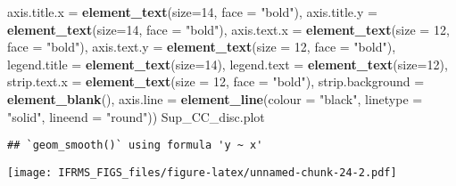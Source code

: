 \documentclass[
]{article}
\newenvironment{Shaded}{\begin{snugshade}}{\end{snugshade}}
\newcommand{\DataTypeTok}[1]{\textcolor[rgb]{0.13,0.29,0.53}{#1}}
\newcommand{\DecValTok}[1]{\textcolor[rgb]{0.00,0.00,0.81}{#1}}
\newcommand{\KeywordTok}[1]{\textcolor[rgb]{0.13,0.29,0.53}{\textbf{#1}}}
\newcommand{\NormalTok}[1]{#1}
\newcommand{\StringTok}[1]{\textcolor[rgb]{0.31,0.60,0.02}{#1}}
\begin{document}
\begin{Shaded}
\begin{Highlighting}[]
        \DataTypeTok{axis.title.x =} \KeywordTok{element_text}\NormalTok{(}\DataTypeTok{size=}\DecValTok{14}\NormalTok{, }\DataTypeTok{face =} \StringTok{"bold"}\NormalTok{),}
        \DataTypeTok{axis.title.y =} \KeywordTok{element_text}\NormalTok{(}\DataTypeTok{size=}\DecValTok{14}\NormalTok{, }\DataTypeTok{face =} \StringTok{"bold"}\NormalTok{),}
        \DataTypeTok{axis.text.x =} \KeywordTok{element_text}\NormalTok{(}\DataTypeTok{size =} \DecValTok{12}\NormalTok{, }\DataTypeTok{face =} \StringTok{"bold"}\NormalTok{),}
        \DataTypeTok{axis.text.y =} \KeywordTok{element_text}\NormalTok{(}\DataTypeTok{size =} \DecValTok{12}\NormalTok{, }\DataTypeTok{face =} \StringTok{"bold"}\NormalTok{),}
        \DataTypeTok{legend.title =} \KeywordTok{element_text}\NormalTok{(}\DataTypeTok{size=}\DecValTok{14}\NormalTok{), }
        \DataTypeTok{legend.text =} \KeywordTok{element_text}\NormalTok{(}\DataTypeTok{size=}\DecValTok{12}\NormalTok{),}
        \DataTypeTok{strip.text.x =} \KeywordTok{element_text}\NormalTok{(}\DataTypeTok{size =} \DecValTok{12}\NormalTok{, }\DataTypeTok{face =} \StringTok{"bold"}\NormalTok{),}
        \DataTypeTok{strip.background =} \KeywordTok{element_blank}\NormalTok{(),}
        \DataTypeTok{axis.line =} \KeywordTok{element_line}\NormalTok{(}\DataTypeTok{colour =} \StringTok{"black"}\NormalTok{, }\DataTypeTok{linetype =} \StringTok{"solid"}\NormalTok{, }\DataTypeTok{lineend =} \StringTok{"round"}\NormalTok{)) }
\NormalTok{Sup_CC_disc.plot}
\end{Highlighting}
\end{Shaded}

\begin{verbatim}
## `geom_smooth()` using formula 'y ~ x'
\end{verbatim}

\texttt{[image: IFRMS\_FIGS\_files/figure-latex/unnamed-chunk-24-2.pdf]}
\end{document}
